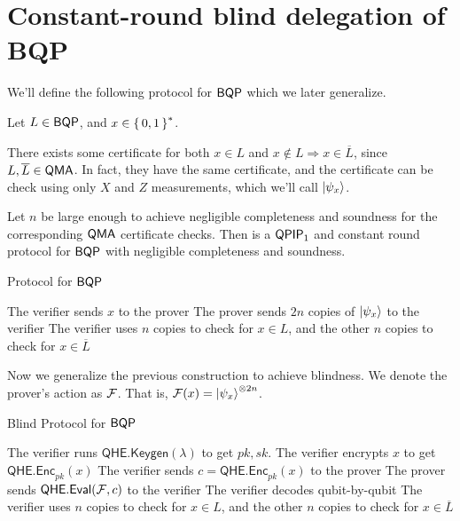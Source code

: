 \section{Constant-round blind delegation of BQP}


We'll define the following protocol for $\operatorname{\mathsf{BQP}}$ which we later generalize.

Let $L\in\operatorname{\mathsf{BQP}}$, and $x\in\set{0,1}^*$.

There exists some certificate for both $x\in L$ and $x\notin L\Rightarrow x\in\overline{L}$, since $L, \overline{L}\in\operatorname{\mathsf{QMA}}$.
In fact, they have the same certificate, and the certificate can be check using only $X$ and $Z$ measurements, which we'll call $\ket{\psi_x}$. 

\begin{thm}
	Let $n$ be large enough to achieve negligible completeness and soundness for the corresponding $\operatorname{\mathsf{QMA}}$ certificate checks.
	Then  is a $\operatorname{\mathsf{QPIP}}_1$ and constant round protocol for $\operatorname{\mathsf{BQP}}$ with negligible completeness and soundness.
\end{thm}

\begin{algorithm}
	\caption{Protocol for $\operatorname{\mathsf{BQP}}$}
	\label{proto:BQP}
	\begin{algorithmic}[1]
		\State The verifier sends $x$ to the prover
		\State The prover sends $2n$ copies of $\ket{\psi_x}$ to the verifier
		\State The verifier uses $n$ copies to check for $x\in L$, and the other $n$ copies to check for $x\in\overline{L}$
	\end{algorithmic}
\end{algorithm}

Now we generalize the previous construction to achieve blindness.
We denote the prover's action as $\mathcal{F}$. That is, $\mathcal{F}(x)=\ket{\psi_x}^{\otimes 2n}$.

\begin{algorithm}
	\caption{Blind Protocol for $\operatorname{\mathsf{BQP}}$}
	\label{proto:BlindBQP}
	\begin{algorithmic}[1]
		\State The verifier runs $\mathsf{QHE.Keygen}(\lambda)$ to get $pk, sk$. 
		\State The verifier encrypts $x$ to get $\mathsf{QHE.Enc}_{pk}(x)$
		\State The verifier sends $c=\mathsf{QHE.Enc}_{pk}(x)$ to the prover
		\State The prover sends $\mathsf{QHE.Eval}(\mathcal{F}, c)$ to the verifier
		\State The verifier decodes qubit-by-qubit 
		\State The verifier uses $n$ copies to check for $x\in L$, and the other $n$ copies to check for $x\in\overline{L}$
	\end{algorithmic}
\end{algorithm}

